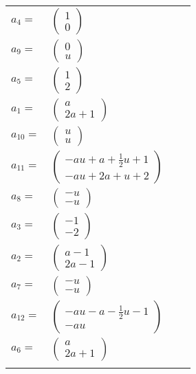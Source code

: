 \documentclass[1p]{elsarticle_modified}
\theoremstyle{definition}
\begin{document}
\begin{tabular}{m{7pt} m{180pt} m{7pt} m{180pt} }
\flushright $a_{4}=$&$\begin{pmatrix}1\\0\end{pmatrix}$ \\
\flushright $a_{9}=$&$\begin{pmatrix}0\\u\end{pmatrix}$ \\
\flushright $a_{5}=$&$\begin{pmatrix}1\\2\end{pmatrix}$ \\
\flushright $a_{1}=$&$\begin{pmatrix}a\\2 a+1\end{pmatrix}$ \\
\flushright $a_{10}=$&$\begin{pmatrix}u\\u\end{pmatrix}$ \\
\flushright $a_{11}=$&$\begin{pmatrix}- a u+a+\frac{1}{2} u+1\\- a u+2 a+u+2\end{pmatrix}$ \\
\flushright $a_{8}=$&$\begin{pmatrix}- u\\- u\end{pmatrix}$ \\
\flushright $a_{3}=$&$\begin{pmatrix}-1\\-2\end{pmatrix}$ \\
\flushright $a_{2}=$&$\begin{pmatrix}a-1\\2 a-1\end{pmatrix}$ \\
\flushright $a_{7}=$&$\begin{pmatrix}- u\\- u\end{pmatrix}$ \\
\flushright $a_{12}=$&$\begin{pmatrix}- a u- a-\frac{1}{2} u-1\\- a u\end{pmatrix}$ \\
\flushright $a_{6}=$&$\begin{pmatrix}a\\2 a+1\end{pmatrix}$\\&\end{tabular}
\end{document}
